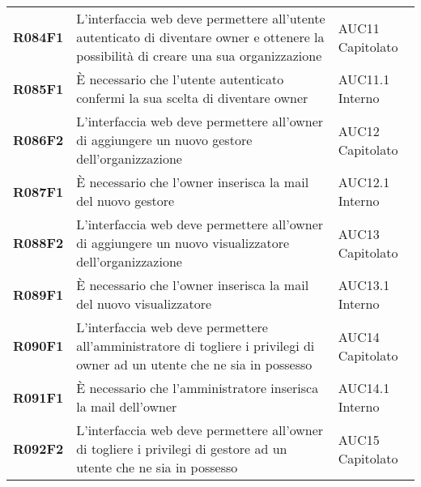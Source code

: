 \documentclass[../analisi-dei-requisiti.tex]{subfiles}
\begin{document}
\begin{longtable}[H]{>{\centering\bfseries}m{3cm} >{\centering}m{10cm} >{\centering\arraybackslash}m{3cm}}
  R084F1                               & L'interfaccia web deve permettere all'utente autenticato di diventare owner e ottenere la possibilità di creare una sua organizzazione                                                                  & AUC11 Capitolato              \\
  R085F1                               & È necessario che l'utente autenticato confermi la sua scelta di diventare owner                                                                                                                         & AUC11.1 Interno               \\
  R086F2                               & L'interfaccia web deve permettere all'owner di aggiungere un nuovo gestore dell'organizzazione                                                                                                          & AUC12 Capitolato              \\
  R087F1                               & È necessario che l'owner inserisca la mail del nuovo gestore                                                                                                                                            & AUC12.1 Interno               \\
  R088F2                               & L'interfaccia web deve permettere all'owner di aggiungere un nuovo visualizzatore dell'organizzazione                                                                                                   & AUC13 Capitolato              \\
  R089F1                               & È necessario che l'owner inserisca la mail del nuovo visualizzatore                                                                                                                                     & AUC13.1 Interno               \\
  R090F1                               & L'interfaccia web deve permettere all'amministratore di togliere i privilegi di owner ad un utente che ne sia in possesso                                                                               & AUC14 Capitolato              \\
  R091F1                               & È necessario che l'amministratore inserisca la mail dell'owner                                                                                                                                          & AUC14.1 Interno               \\
  R092F2                               & L'interfaccia web deve permettere all'owner di togliere i privilegi di gestore ad un utente che ne sia in possesso                                                                                      & AUC15 Capitolato              \\

\end{longtable}
\end{document}
